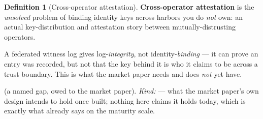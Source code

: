 \documentclass[11pt,a4paper]{article}
\theoremstyle{definition}
\newtheorem{definition}{Definition}[section]
\begin{document}
\begin{definition}[Cross-operator attestation]\label{def:cross-operator-attestation}\label{def:0040b}
\setlength{\parskip}{4pt plus 1pt}
\textbf{Cross-operator attestation} is the \emph{unsolved} problem of binding
identity keys across harbors you do \emph{not} own: an actual key-distribution and
attestation story between mutually-distrusting operators. 

A federated witness log
gives log-\emph{integrity}, not identity-\emph{binding} --- it can prove an entry
was recorded, but not that the key behind it is who it claims to be across a trust
boundary. This is what the market paper needs and does \emph{not} yet have.


\VISION{} (a named gap, owed to the market paper). \emph{Kind:} \DesignInvariantKind{}
--- what the market paper's own design intends to hold once built; nothing
here claims it holds today, which is exactly what \VISION{} already says on
the maturity scale.
\end{definition}



\end{document}
